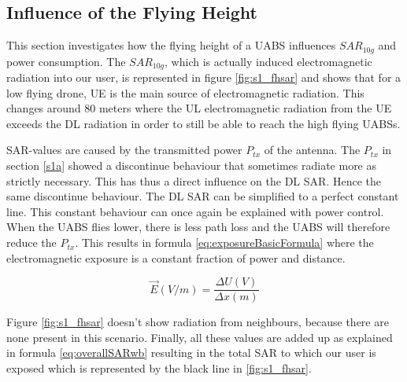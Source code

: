\FloatBarrier
\subsection{Influence of the Flying Height}
\label{sub:senario1_influenceOfFlyHeight}

This section investigates how the flying height of a \gls{UABS} influences $SAR_{10g}$ and power consumption.
The $SAR_{10g}$, which is actually induced electromagnetic radiation into our user, is represented in figure \ref{fig:s1_fhsar}
and shows that for a low flying drone, \gls{UE} is the main source of electromagnetic radiation.
This changes around 80 meters where the \gls{UL} electromagnetic radiation from the \gls{UE}
exceeds the \gls{DL} radiation in order to still be able to reach the high flying \gls{UABS}s.

\gls{SAR}-values are caused by the transmitted power  $P_{tx}$ of the antenna. The $P_{tx}$ in section \ref{s1a}
showed a discontinue behaviour that sometimes radiate more as strictly necessary. This has thus a direct influence
on the \gls{DL} \gls{SAR}. Hence the same discontinue behaviour. The \gls{DL} \gls{SAR} can be simplified to a perfect constant line.
This constant behaviour can once again be explained with power control. When the \gls{UABS} flies lower, there is  less path loss and the \gls{UABS} 
will therefore reduce the $P_{tx}$. This results in formula \ref{eq:exposureBasicFormula} where the electromagnetic exposure is a constant fraction of power and distance.

\begin{equation}
\vec{E} (V/m) = \frac{\Delta U (V) }{\Delta x (m)}
\label{eq:exposureBasicFormula}
\end{equation}


Figure \ref{fig:s1_fhsar} doesn't show radiation from neighbours, because there are none present in this scenario. 
Finally, all these values are added up as explained in formula \ref{eq:overallSARwb} resulting in the total \gls{SAR}
to which our user is exposed which is represented by the black line in \ref{fig:s1_fhsar}.

